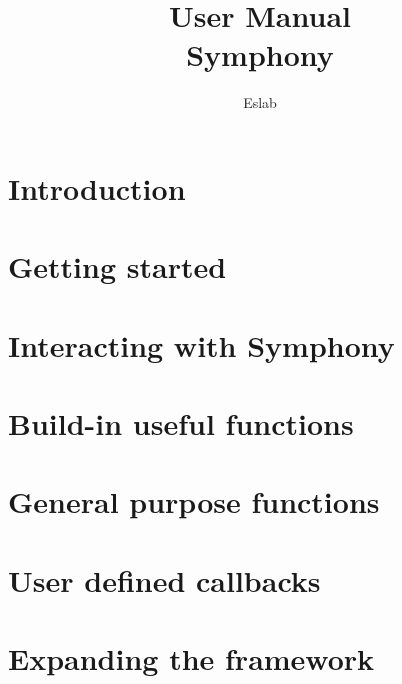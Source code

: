 \documentclass{ol-softwaremanual}
\title{User Manual \\Symphony}
\author{Eslab}
\begin{document}
\maketitle

\tableofcontents
\newpage

\section{Introduction}




\section{Getting started}
\label{sec:getting_started}


\section{Interacting with Symphony}



\section{Build-in useful functions}





\section{General purpose functions}








\section{User defined callbacks}


\section{Expanding the framework}


% 
\end{document}
